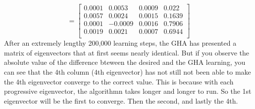 \documentclass[epsfig]{article}
\begin{document}
$$ 
=
\begin{bmatrix}
    0.0001 &   0.0053 &   0.0009&    0.022 \\
   0.0057 &   0.0024  & 0.0015&   0.1639 \\
    0.0001 &  -0.0009  &  0.0016&   0.7906 \\
    0.0019  &  0.0021 &  0.0007 &   0.6944 \\
\end{bmatrix}
$$
After an extremely lengthy 200,000 learning steps, the GHA has presented a matrix of eigenvectors that at first seems nearly identical. But if you observe the absolute value of the difference bteween the desired and the GHA learning, you can see that the 4th column (4th eigenvector) has not still not been able to make the 4th eigenvector converge to the correct value. This is because with each progressive eigenvector, the algorithmn takes longer and longer to run. So the 1st eigenvector will be the first to converge. Then the second, and lastly the 4th.\\
\newline
\end{document}
